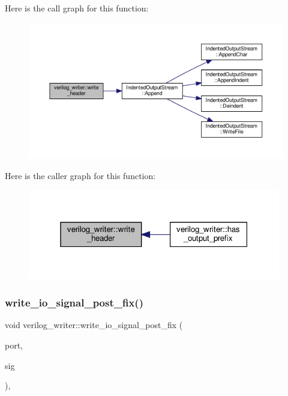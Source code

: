 Here is the call graph for this function\+:
\nopagebreak
\begin{figure}[H]
\begin{center}
\leavevmode
\includegraphics[width=350pt]{d8/dba/classverilog__writer_a36a19f7e6beea0b3d1c16389397cf9ea_cgraph}
\end{center}
\end{figure}
Here is the caller graph for this function\+:
\nopagebreak
\begin{figure}[H]
\begin{center}
\leavevmode
\includegraphics[width=313pt]{d8/dba/classverilog__writer_a36a19f7e6beea0b3d1c16389397cf9ea_icgraph}
\end{center}
\end{figure}
\mbox{\label{classverilog__writer_a4f2930898accd739d654c4afb425814c}} 
\subsubsection{\texorpdfstring{write\+\_\+io\+\_\+signal\+\_\+post\+\_\+fix()}{write\_io\_signal\_post\_fix()}}
{\footnotesize\ttfamily void verilog\+\_\+writer\+::write\+\_\+io\+\_\+signal\+\_\+post\+\_\+fix (\begin{DoxyParamCaption}\item[{const \hyperlink{structural__objects_8hpp_a8ea5f8cc50ab8f4c31e2751074ff60b2}{structural\+\_\+object\+Ref} \&}]{port,  }\item[{const \hyperlink{structural__objects_8hpp_a8ea5f8cc50ab8f4c31e2751074ff60b2}{structural\+\_\+object\+Ref} \&}]{sig }\end{DoxyParamCaption})\hspace{0.3cm}{\ttfamily [override]}, {\ttfamily [virtual]}}



